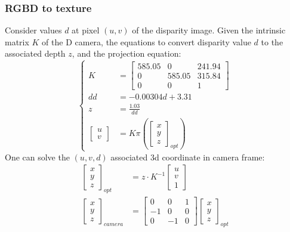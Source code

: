 \documentclass[conference]{IEEEtran}
\begin{document}
\subsubsection{RGBD to texture}
Consider values $d$ at pixel $(u, v)$ of the disparity image.
Given the intrinsic matrix $K$ of the D camera, 
the equations to convert disparity value $d$ to the associated depth $z$,
and the projection equation:
$$
\left\{  
\begin{aligned}
    K&=\left[ \begin{matrix}585.05&0&241.94\\ 0&585.05&315.84\\ 0&0&1\end{matrix} \right]  \\ 
    dd&=-0.00304d+3.31\\ 
    z&=\frac{1.03}{dd} \\ 
    \left[ \begin{gathered}u\\ v\end{gathered} \right]  &=K\pi \left( \left[ \begin{gathered}x\\ y\\ z\end{gathered} \right]_{opt}  \right)  
\end{aligned}
\right.
$$
One can solve the $(u, v, d)$ associated 3d coordinate in camera frame:
$$
\begin{aligned}
    \left[ \begin{gathered}x\\ y\\ z\end{gathered} \right]_{opt}
        & = z \cdot K^{-1} \left[ \begin{gathered}u\\ v\\ 1\end{gathered} \right] \\
    \left[ \begin{gathered}x\\ y\\ z\end{gathered} \right]_{camera}
        & = \left[ \begin{matrix}0&0&1\\ -1&0&0\\ 0&-1&0\end{matrix} \right]  \left[ \begin{gathered}x\\ y\\ z\end{gathered} \right]_{opt}  
\end{aligned}
$$
\end{document}
